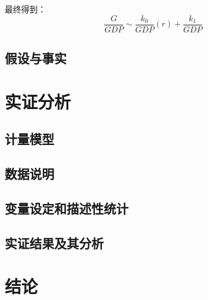 \documentclass[10pt]{article}
\begin{document}
\added[remark={推导过程留待誊抄}]{}

最终得到：
\begin{equation}
\frac{G}{GDP} \sim \frac{k_0}{GDP}(r) + \frac{k_1}{GDP}
\end{equation}
\subsection{假设与事实}

\section{实证分析}
\subsection{计量模型}
\subsection{数据说明}
\subsection{变量设定和描述性统计}

\subsection{实证结果及其分析}

\section{结论}


\renewcommand\refname{参考文献}
%

\end{document}

